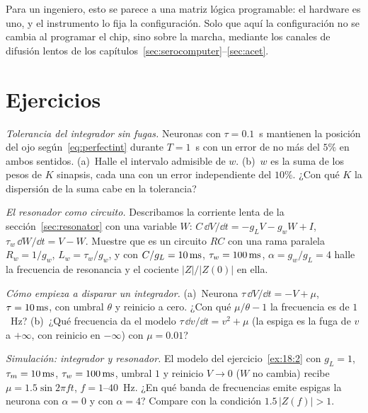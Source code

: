 Para un ingeniero, esto se parece a una matriz lógica programable: el hardware es uno, y el instrumento lo fija la configuración. Solo que aquí la configuración no se cambia al programar el chip, sino sobre la marcha, mediante los canales de difusión lentos de los capítulos~\ref{sec:serocomputer}--\ref{sec:acet}.

\section{Ejercicios}

\begin{exercise}[\lvlA]
\label{ex:18:1}
\emph{Tolerancia del integrador sin fugas.} Neuronas con $\tau=0.1$~s mantienen la posición del ojo según~\eqref{eq:perfectint} durante $T=1$~s con un error de no más del $5\%$ en ambos sentidos. (a)~Halle el intervalo admisible de $w$. (b)~$w$ es la suma de los pesos de $K$ sinapsis, cada una con un error independiente del $10\%$. ¿Con qué $K$ la dispersión de la suma cabe en la tolerancia?
\end{exercise}

\begin{exercise}[\lvlB]
\label{ex:18:2}
\emph{El resonador como circuito.} Describamos la corriente lenta de la sección~\ref{sec:resonator} con una variable $W$: $C\,\dd V/\dd t=-g_LV-g_wW+I$, $\tau_w\,\dd W/\dd t=V-W$. Muestre que es un circuito $RC$ con una rama paralela $R_w=1/g_w$, $L_w=\tau_w/g_w$, y con $C/g_L=10\,\text{ms}$, $\tau_w=100\,\text{ms}$, $\alpha=g_w/g_L=4$ halle la frecuencia de resonancia y el cociente $|Z|/|Z(0)|$ en ella.
\end{exercise}

\begin{exercise}[\lvlB]
\label{ex:18:3}
\emph{Cómo empieza a disparar un integrador.} (a)~Neurona $\tau\,\dd V/\dd t=-V+\mu$, $\tau=10\,\text{ms}$, con umbral $\theta$ y reinicio a cero. ¿Con qué $\mu/\theta-1$ la frecuencia es de $1$~Hz? (b)~¿Qué frecuencia da el modelo $\tau\,\dd v/\dd t=v^2+\mu$ (la espiga es la fuga de $v$ a $+\infty$, con reinicio en $-\infty$) con $\mu=0.01$?
\end{exercise}

\begin{exercise}[\lvlB]
\label{ex:18:4}
\emph{Simulación: integrador y resonador.} El modelo del ejercicio~\ref{ex:18:2} con $g_L=1$, $\tau_m=10\,\text{ms}$, $\tau_w=100\,\text{ms}$, umbral $1$ y reinicio $V\to0$ ($W$ no cambia) recibe $\mu=1.5\sin2\pi ft$, $f=1$--$40$~Hz. ¿En qué banda de frecuencias emite espigas la neurona con $\alpha=0$ y con $\alpha=4$? Compare con la condición $1.5\,|Z(f)|>1$.
\end{exercise}

